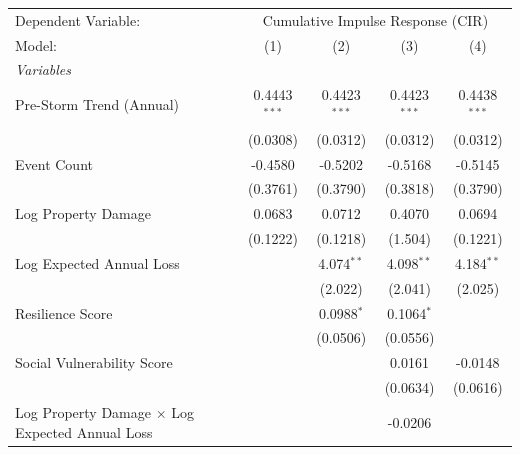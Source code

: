 
\begingroup
\centering
\begin{tabular}{lcccc}
   \tabularnewline \midrule \midrule
   Dependent Variable: & \multicolumn{4}{c}{Cumulative Impulse Response (CIR)}\\
   Model:                                                 & (1)            & (2)            & (3)            & (4)\\  
   \midrule
   \emph{Variables}\\
   Pre-Storm Trend (Annual)                               & 0.4443$^{***}$ & 0.4423$^{***}$ & 0.4423$^{***}$ & 0.4438$^{***}$\\   
                                                          & (0.0308)       & (0.0312)       & (0.0312)       & (0.0312)\\   
   Event Count                                            & -0.4580        & -0.5202        & -0.5168        & -0.5145\\   
                                                          & (0.3761)       & (0.3790)       & (0.3818)       & (0.3790)\\   
   Log Property Damage                                    & 0.0683         & 0.0712         & 0.4070         & 0.0694\\   
                                                          & (0.1222)       & (0.1218)       & (1.504)        & (0.1221)\\   
   Log Expected Annual Loss                               &                & 4.074$^{**}$   & 4.098$^{**}$   & 4.184$^{**}$\\   
                                                          &                & (2.022)        & (2.041)        & (2.025)\\   
   Resilience Score                                       &                & 0.0988$^{*}$   & 0.1064$^{*}$   &   \\   
                                                          &                & (0.0506)       & (0.0556)       &   \\   
   Social Vulnerability Score                             &                &                & 0.0161         & -0.0148\\   
                                                          &                &                & (0.0634)       & (0.0616)\\   
   Log Property Damage $\times$ Log Expected Annual Loss  &                &                & -0.0206        &   \\   

\end{tabular}

